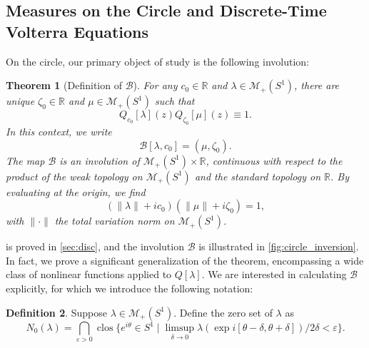 \documentclass{cams-l} %
\newcommand{\dave}[1]{#1}\newcommand{\davebegin}{}\newcommand{\daveend}{}\newcommand{\george}[1]{#1}
\newcommand{\RR}{\mathbb R}
\newcommand{\cM}{\mathcal M}
\newcommand{\cB}{\mathcal B}
\newcommand{\eps}{\varepsilon}
\newcommand{\op}{\operatorname}
\newtheorem{theorem}{Theorem}[section]
\theoremstyle{definition}
\newtheorem{definition}[theorem]{Definition}
\theoremstyle{remark}
\numberwithin{equation}{section}
\begin{document}
\subsection{Measures on the Circle and Discrete-Time Volterra Equations}\label{sec:main_circ}
On the circle, our primary object of study is the following involution:
\begin{theorem}[Definition of $\cB$]\label{thm:main_circle}
    For any $c_0\in\RR$ and $\lambda\in\cM_+(S^1)$, there are unique $\zeta_0\in\RR$ and $\mu\in\cM_+(S^1)$ such that
    \[Q_{c_0}[\lambda](z)Q_{\zeta_0}[\mu](z)\equiv 1.\]
    In this context, we write
    \begin{equation}\label{eq:involution_s1}
        \cB[\lambda,c_0] = (\mu,\zeta_0).
    \end{equation}
    The map $\cB$ is an involution of $\cM_+(S^1)\times\RR$, continuous with respect to the product of the weak topology on $\cM_+(S^1)$ and the standard topology on $\RR$. By evaluating at the origin, we find
    \[(\|\lambda\| + ic_0)(\|\mu\|+i\zeta_0) = 1,\]
    with $\|\cdot\|$ the total variation norm on $\cM_+(S^1)$.
\end{theorem}
 is proved in \cref{sec:disc}, \dave{and the involution $\cB$ is illustrated in \cref{fig:circle_inversion}.} In fact, we prove a significant generalization of the theorem, encompassing a wide class of nonlinear functions applied to $Q[\lambda]$. We are interested in calculating $\cB$ explicitly, for which we introduce the following notation:
\begin{definition}\label{def:zeroset_circ}
    Suppose $\lambda\in\cM_+(S^1)$. Define the zero set of $\lambda$ as
    \[N_{0}(\lambda) = \bigcap_{\eps>0}\op{clos}\Big\{e^{i\theta}\in S^1\;\Big|\;\limsup_{\delta\to 0}\lambda(\exp i[\theta-\delta,\theta+\delta])/2\delta < \eps\Big\}.\]
\end{definition}
\end{document}
